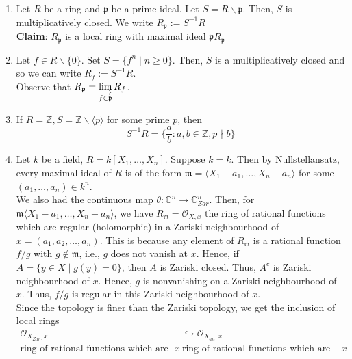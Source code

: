 \documentclass[oneside, 12pt]{scrbook}
\newcommand{\CC}{\mathbb C}
\newcommand{\ZZ}{\mathbb Z}
\newcommand{\pr}{\mathfrak{p}}
\newcommand{\m}{\mathfrak{m}}
\newcommand{\bs}{\backslash}
\newcommand{\ds}{\displaystyle}
\theoremstyle{theorem}
\begin{document}
\begin{example}
\begin{enumerate}
\item Let $R$ be a ring and $\pr$ be a prime ideal. Let $S = R\bs \pr$. Then, $S$ is multiplicatively closed. We write $R_{\pr} := S^{-1}R$\\

\textbf{Claim}: $R_{\pr}$ is a local ring with maximal ideal $\pr R_{\pr}$

\item Let $f \in R\bs\{0\}$. Set $S = \{f^n \mid n\geq 0\}$. Then, $S$ is a multiplicatively closed and so we can write $R_{f}:= S^{-1}R$.  \\

Observe that  $R_{\pr} = \ds{\varinjlim_{f \in \pr} R_{f}}$.
\item If $R=\ZZ, S= \ZZ\bs \langle p \rangle$ for some prime $p$, then $$S^{-1}R = \{\frac{a}{b}: a,b \in \ZZ , p \nmid b\}$$
\item Let $k$ be a field, $R = k[X_{1}, \hdots , X_{n}]$. Suppose $k = \bar{k}$. Then by Nullstellansatz, every maximal ideal of $R$ is of the form $\m = \langle X_{1} - a_{1}, \hdots , X_{n}-a_{n} \rangle$ for some $(a_{1}, \hdots , a_{n} ) \in k^n$. \\
We also had the continuous map $\theta : \CC^n \rightarrow \CC^n_{Zar}$. Then, for $\m \langle X_{1}-a_{1},\hdots , X_{n}-a_{n} \rangle$, we have $R_{\m} = \mathcal{O}_{X,x}$ the ring of rational functions which are regular (holomorphic) in a Zariski neighbourhood of $x=(a_{1}, a_{2}, \hdots , a_{n})$. This is because any element of $R_{\m}$ is a rational function $f/g$ with $g \not \in \m$, i.e., $g$ does not vanish at $x$. Hence, if $A = \{y \in X\mid  g(y)=0\}$, then $A$ is Zariski closed. Thus, $A^c$ is Zariski neighbourhood of $x$. Hence, $g$ is nonvanishing on a Zariski neighbourhood of $x$. Thus, $f/g$ is regular in this Zariski neighbourhood of $x$. \\

Since the topology is finer than the Zariski topology, we get the inclusion of local rings 
\begin{align*}
\mathcal{O}_{X_{Zar},x} &\hookrightarrow \mathcal{O}_{X_{an},x} \\
\text{ring of rational functions which are regular in a Zariski nbd of }x & \text{ring of rational functions which are regular in an analytic nbd of }x 
\end{align*} 
\end{enumerate}
\end{example}
\end{document}
